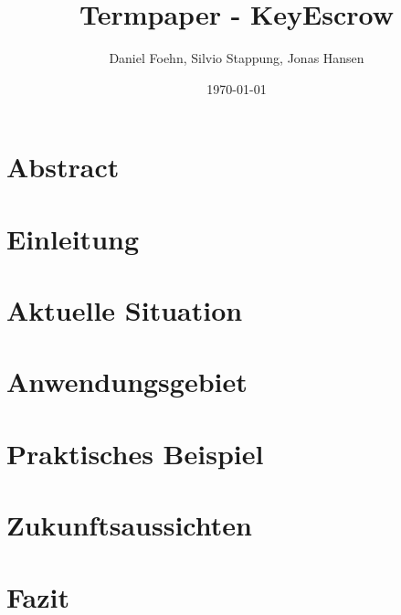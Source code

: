 \documentclass[a4paper, 10pt, fleqn]{article}
\title{Termpaper - KeyEscrow}
\author{Daniel Foehn, Silvio Stappung, Jonas Hansen}
\date{\today} %
\newcommand*{\titleGM}{\begingroup %
\hbox{ %
\hspace*{0.2\textwidth} %
\rule{1pt}{\textheight} %
\hspace*{0.05\textwidth} %
\parbox[b]{0.75\textwidth}{ %

{\noindent\Huge\bfseries Termpaper \\[0.5\baselineskip] Key Escrow}\\[2\baselineskip] %
{\large \textit{HSLU Modul - Network \& Cloud Services}}\\[4\baselineskip] %
{\Large \textsc{Daniel Föhn, Jonas Hansen \\[0.5\baselineskip] und Silvio Stappung}} %

\vspace{0.5\textheight} %
{\noindent \today}\\[\baselineskip] %
}}
\endgroup}
\begin{document}
\begin{titlepage}
	\titleGM
	\thispagestyle{empty}
\end{titlepage}

\tableofcontents
\listoffigures
\clearpage

\section*{Abstract}

\clearpage
\section{Einleitung}
	

\clearpage
\section{Aktuelle Situation}
	

\clearpage
\section{Anwendungsgebiet}
	

\clearpage
\section{Praktisches Beispiel}
	 

\clearpage
\section{Zukunftsaussichten}

\clearpage
\section{Fazit}

\nocite{*}
\clearpage


\end{document}
